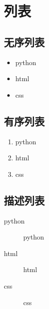 

\chapter{列表}
\section{无序列表}
\begin{itemize}
  \item python
  \item html
  \item css
\end{itemize}
\section{有序列表}
\begin{enumerate}
  \item python
  \item html
  \item css
\end{enumerate}
\section{描述列表}
\begin{description}
  \item[python] python
  \item[html] html
  \item[css] css
\end{description}